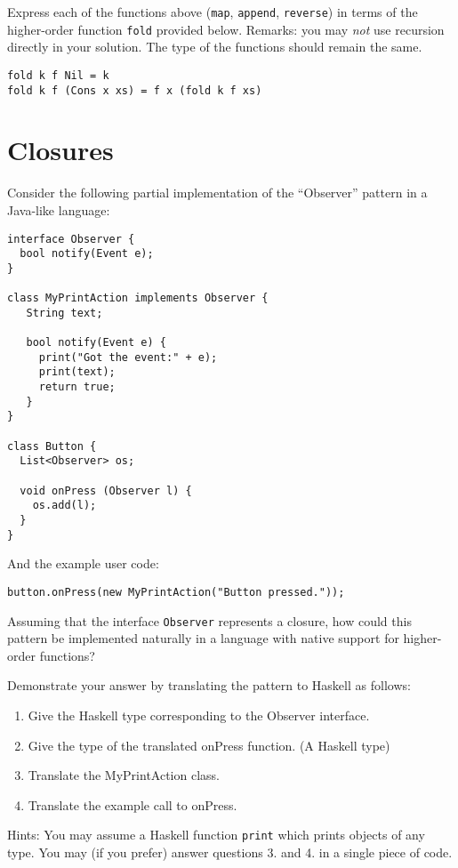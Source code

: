 \documentclass{article}
\newcommand{\answer}[1]{}
\begin{document}
Express each of the functions above (\texttt{map}, \texttt{append},
\texttt{reverse})  in terms of the higher-order
function \texttt{fold} provided below.  Remarks: you may \emph{not}
use recursion directly in your solution. The type of the functions
should remain the same.

\begin{verbatim}
fold k f Nil = k
fold k f (Cons x xs) = f x (fold k f xs)
\end{verbatim}
\answer{
  \begin{verbatim}
    map f = fold Nil (\x -> Cons (f x))
    append xs ys = fold ys Cons xs
    reverse = fold Nil (\x xs -> append xs (Cons x Nil))
  \end{verbatim}
}
\newpage
\section{Closures}

Consider the following partial implementation of the ``Observer''
pattern in a Java-like language:
\begin{verbatim}
interface Observer {
  bool notify(Event e);
}

class MyPrintAction implements Observer {
   String text;

   bool notify(Event e) {
     print("Got the event:" + e);
     print(text);
     return true;
   }
}

class Button {
  List<Observer> os;

  void onPress (Observer l) {
    os.add(l);
  }
}
\end{verbatim}

And the example user code:

\begin{verbatim}
button.onPress(new MyPrintAction("Button pressed."));
\end{verbatim}

Assuming that the interface \texttt{Observer} represents a closure, how
could this pattern be implemented naturally in a language with native
support for higher-order functions?

Demonstrate your answer by translating the pattern to Haskell as
follows:
\begin{enumerate}
\item Give the Haskell type corresponding to the Observer interface.
\item Give the type of the translated onPress function. (A Haskell type) 
\item Translate the MyPrintAction class. 
\item Translate the example call to onPress. 
\end{enumerate}
Hints: You may assume a Haskell function \texttt{print} which prints
objects of any type.  You may (if you prefer) answer questions 3. and
4. in a single piece of code.
\end{document}
